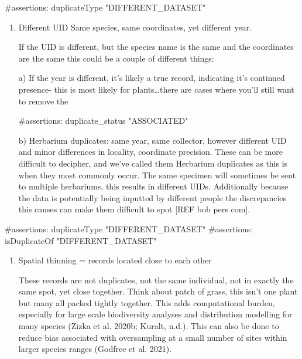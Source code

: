 \documentclass[
  letterpaper,
  DIV=11,
  numbers=noendperiod,
  oneside]{scrreprt}
\newenvironment{Shaded}{\begin{snugshade}}{\end{snugshade}}
\newcommand{\CommentTok}[1]{\textcolor[rgb]{0.37,0.37,0.37}{#1}}
\begin{document}
\begin{Shaded}
\begin{Highlighting}[]
\CommentTok{\#assertions: duplicateType "DIFFERENT\_DATASET"}
\end{Highlighting}
\end{Shaded}

\begin{enumerate}
\def\labelenumi{\arabic{enumi}.}
\setcounter{enumi}{1}
\item
  Different UID Same species, same coordinates, yet different year.

  If the UID is different, but the species name is the same and the
  coordinates are the same this could be a couple of different things:

  a) If the year is different, it's likely a true record, indicating
  it's continued presence- this is most likely for plants\ldots there
  are cases where you'll still want to remove the

\begin{Shaded}
\begin{Highlighting}[]
\CommentTok{\#assertions: duplicate\_status "ASSOCIATED"}
\end{Highlighting}
\end{Shaded}

  b) Herbarium duplicates: same year, same collector, however different
  UID and minor differences in locality, coordinate precision. These can
  be more difficult to decipher, and we've called them Herbarium
  duplicates as this is when they most commonly occur. The same specimen
  will sometimes be sent to multiple herbariums, this results in
  different UIDs. Additionally because the data is potentially being
  inputted by different people the discrepancies this causes can make
  them difficult to spot {[}REF bob pers com{]}.
\end{enumerate}

\begin{Shaded}
\begin{Highlighting}[]
\CommentTok{\#assertions: duplicateType "DIFFERENT\_DATASET"}
\CommentTok{\#assertions: isDuplicateOf "DIFFERENT\_DATASET"}
\end{Highlighting}
\end{Shaded}

\begin{enumerate}
\def\labelenumi{\arabic{enumi}.}
\setcounter{enumi}{2}
\item
  Spatial thinning = records located close to each other

  These records are not duplicates, not the same individual, not in
  exactly the same spot, yet close together. Think about patch of grass,
  this isn't one plant but many all packed tightly together. This adds
  computational burden, especially for large scale biodiversity analyses
  and distribution modelling for many species (Zizka et al. 2020b;
  Kuralt, n.d.). This can also be done to reduce bias associated with
  oversampling at a small number of sites within larger species ranges
  (Godfree et al. 2021).
\end{enumerate}
\end{document}
